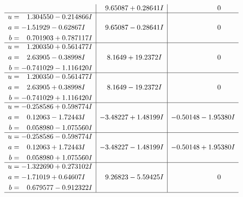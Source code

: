 \documentclass[1p]{elsarticle_modified}
\theoremstyle{definition}
\begin{document}
$$\begin{array}{c|c|c}
 & \phantom{-}9.65087 + 0.28641 I & \phantom{-0.000000 } 0 \\ \hline\begin{aligned}
u &= \phantom{-}1.304550 - 0.214866 I \\
a &= -1.51929 - 0.62867 I \\
b &= \phantom{-}0.701903 + 0.787117 I\end{aligned}
 & \phantom{-}9.65087 - 0.28641 I & \phantom{-0.000000 } 0 \\ \hline\begin{aligned}
u &= \phantom{-}1.200350 + 0.561477 I \\
a &= \phantom{-}2.63905 - 0.38998 I \\
b &= -0.741029 - 1.116420 I\end{aligned}
 & \phantom{-}8.1649 + 19.2372 I & \phantom{-0.000000 } 0 \\ \hline\begin{aligned}
u &= \phantom{-}1.200350 - 0.561477 I \\
a &= \phantom{-}2.63905 + 0.38998 I \\
b &= -0.741029 + 1.116420 I\end{aligned}
 & \phantom{-}8.1649 - 19.2372 I & \phantom{-0.000000 } 0 \\ \hline\begin{aligned}
u &= -0.258586 + 0.598774 I \\
a &= \phantom{-}0.12063 - 1.72443 I \\
b &= \phantom{-}0.058980 - 1.075560 I\end{aligned}
 & -3.48227 + 1.48199 I & -0.50148 - 1.95380 I \\ \hline\begin{aligned}
u &= -0.258586 - 0.598774 I \\
a &= \phantom{-}0.12063 + 1.72443 I \\
b &= \phantom{-}0.058980 + 1.075560 I\end{aligned}
 & -3.48227 - 1.48199 I & -0.50148 + 1.95380 I \\ \hline\begin{aligned}
u &= -1.322690 + 0.273102 I \\
a &= -1.71019 + 0.64607 I \\
b &= \phantom{-}0.679577 - 0.912322 I\end{aligned}
 & \phantom{-}9.26823 - 5.59425 I & \phantom{-0.000000 } 0\\
 \hline 
 \end{array}$$\newpage$$\begin{array}{c|c|c}  

\end{array}$$
\end{document}
